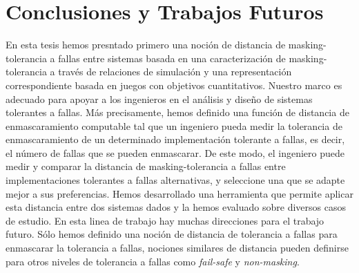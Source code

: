\chapter{Conclusiones y Trabajos Futuros}
\label{cap:conclusiones}

En esta tesis hemos presntado primero una noción de distancia de masking-tolerancia a fallas entre sistemas basada en una caracterización de masking-tolerancia a través de relaciones de simulación y una representación correspondiente basada en juegos con objetivos cuantitativos.
Nuestro marco es adecuado para apoyar a los ingenieros en el análisis y
diseño de sistemas tolerantes a fallas. Más precisamente, hemos definido una función de distancia de enmascaramiento computable tal que un ingeniero pueda medir la tolerancia de enmascaramiento de un determinado
implementación tolerante a fallas, es decir, el número de fallas que se pueden enmascarar.
De este modo, el ingeniero puede medir y comparar la distancia de masking-tolerancia a fallas entre implementaciones tolerantes a fallas alternativas, y seleccione una que
se adapte mejor a sus preferencias.
Hemos desarrollado una herramienta que permite aplicar esta distancia entre dos sistemas dados y la hemos evaluado sobre diversos casos de estudio.
En esta linea de trabajo hay muchas direcciones para el trabajo futuro. Sólo hemos definido una noción de distancia de tolerancia a fallas para enmascarar la tolerancia a fallas, nociones similares de distancia pueden definirse para otros niveles de tolerancia a fallas como \emph{fail-safe} y \emph{non-masking}.

